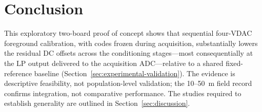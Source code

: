 \section{Conclusion}
\label{sec:conclusion}

This exploratory two-board proof of concept shows that sequential four-VDAC foreground calibration, with codes frozen during acquisition, substantially lowers the residual DC offsets across the conditioning stages---most consequentially at the LP output delivered to the acquisition ADC---relative to a shared fixed-reference baseline (Section~\ref{sec:experimental-validation}). The evidence is descriptive feasibility, not population-level validation; the 10--50~m field record confirms integration, not comparative performance. The studies required to establish generality are outlined in Section~\ref{sec:discussion}.
